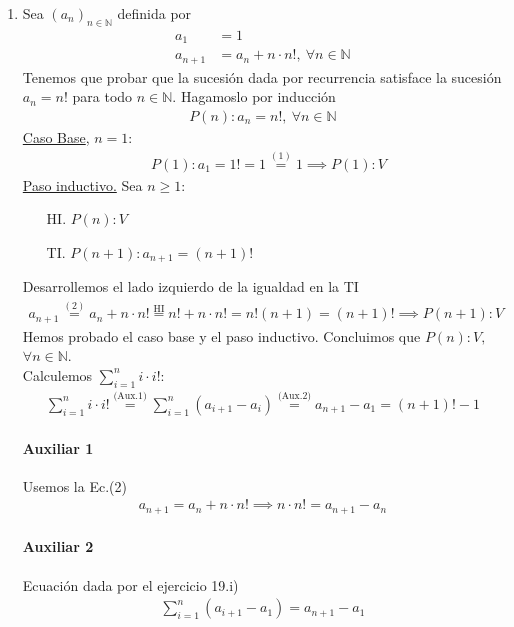 \begin{enumerate}[label=\roman*)]
    \item Sea $(a_n)_{n \in \mathbb{N}}$ definida por
    \setcounter{equation}{0}
    \begin{align}
        a_1 &= 1 \\
        a_{n+1} &= a_n + n \cdot n!,\ \forall n \in \mathbb{N}
    \end{align} 
    Tenemos que probar que la sucesión dada por recurrencia satisface la sucesión $a_n = n!$ para todo $n \in 
    \mathbb{N}$. 
    Hagamoslo por inducción
    \begin{align*}
        P(n): a_n = n!,\ \forall n \in \mathbb{N}
    \end{align*}
    \underline{Caso Base}, $n = 1$:
	    \begin{align*}
		    &P(1): a_1 = 1! = 1 \overset{(1)}{=} 1 \implies P(1):V
	    \end{align*}
	\underline{Paso inductivo.} Sea $n \geq 1$:
	\begin{enumerate}
        \item[HI.] $P(n): V$
        \item[TI.] $P(n+1): a_{n+1} = (n+1)!$
    \end{enumerate}
 	Desarrollemos el lado izquierdo de la igualdad en la TI
    \begin{align*}
  	    a_{n+1} \overset{(2)}{=} a_n + n \cdot n! \overset{\text{HI}}{=} n! + n \cdot n! = n!(n + 1) = (n+1)! 
        \implies P(n+1):V
    \end{align*}
    Hemos probado el caso base y el paso inductivo. Concluimos que $P(n):V,$ $\forall n \in \mathbb{N}$.\\

    Calculemos $\displaystyle \sum_{i=1}^{n}i \cdot i! $:
    \begin{align*}
        \sum_{i=1}^{n} i \cdot i! \overset{\text{(Aux.1)}}{=} \sum_{i=1}^{n} (a_{i+1} - a_i) \overset{\text{(Aux.2)}}{=}
        a_{n+1} - a_1 = (n+1)! - 1
    \end{align*}

    \paragraph{Auxiliar 1}{
        Usemos la Ec.(2)
        \begin{align*}
            a_{n+1} = a_n + n \cdot n! \implies n \cdot n! = a_{n+1} - a_n
        \end{align*}
    }
    \paragraph{Auxiliar 2}{
        Ecuación dada por el ejercicio 19.i)
        \begin{align*}
            \sum_{i=1}^{n}(a_{i+1} - a_1) = a_{n+1} - a_1
        \end{align*}
    }


\end{enumerate}
